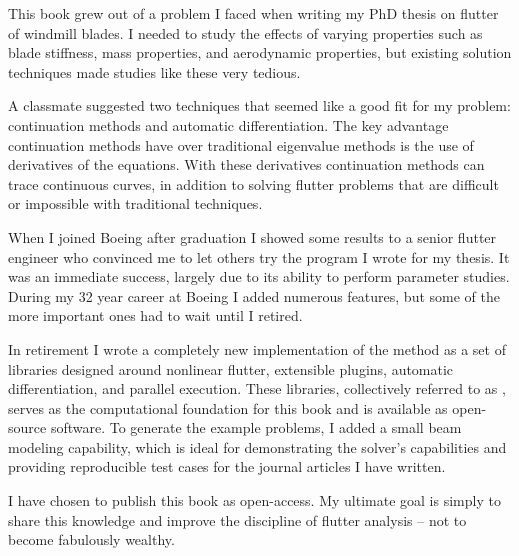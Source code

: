 
This book grew out of a problem I faced when writing
my PhD thesis on flutter of windmill blades.
I needed to study the effects of varying properties such
as blade stiffness, mass properties, and aerodynamic properties,
but existing solution techniques made studies like these
very tedious.

A classmate suggested two techniques that seemed like a good
fit for my problem: continuation methods and automatic differentiation.
The key advantage continuation methods have over traditional
eigenvalue methods is the use of derivatives of the equations.
With these derivatives continuation methods can trace continuous curves,
in addition to solving flutter problems that are difficult or
impossible with traditional techniques.

When I joined Boeing after graduation I showed some results to
a senior flutter engineer who convinced me to let others
try the program I wrote for my thesis.
It was an immediate success, largely due to its ability to
perform parameter studies.
During my 32 year career at Boeing I added numerous features,
but some of the more important ones had to wait until I retired.

In retirement I wrote a completely new implementation of the method
as a set of libraries
designed around nonlinear flutter, extensible plugins,
automatic differentiation, and parallel execution.
These libraries, collectively referred to as \Flaps, serves as the
computational foundation
for this book and is available as open-source software.
To generate the example problems, I added a small beam modeling capability,
which is ideal for demonstrating the solver's capabilities and providing
reproducible test cases for the journal articles I have written.

I have chosen to publish this book as open-access.
My ultimate goal is simply to share this knowledge and improve the
discipline of flutter analysis -- not to become fabulously wealthy.
